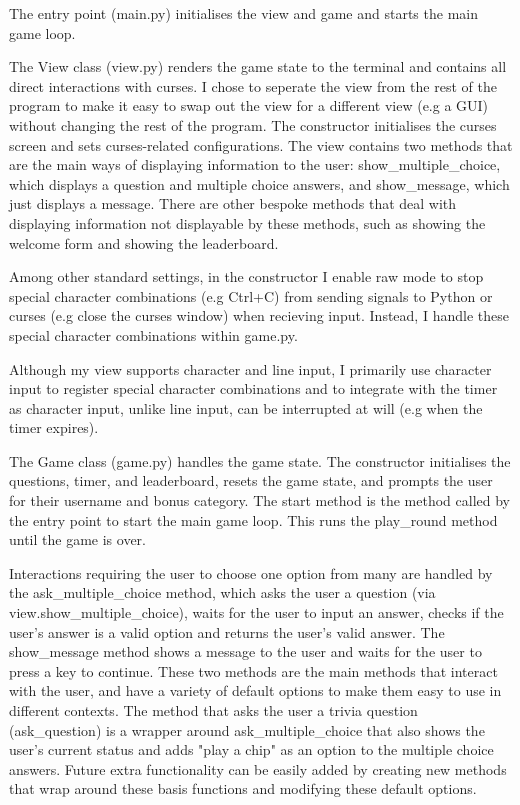 \documentclass[12pt]{article}
\begin{document}
The entry point (main.py) initialises the view and game and starts the main game loop.

\vspace{\baselineskip}

The View class (view.py) renders the game state to the terminal and contains all direct interactions with curses. I chose to seperate the view from the rest of the program to make it easy to swap out the view for a different view (e.g a GUI) without changing the rest of the program. The constructor initialises the curses screen and sets curses-related configurations. The view contains two methods that are the main ways of displaying information to the user: show\_multiple\_choice, which displays a question and multiple choice answers, and show\_message, which just displays a message. There are other bespoke methods that deal with displaying information not displayable by these methods, such as showing the welcome form and showing the leaderboard.

Among other standard settings, in the constructor I enable raw mode to stop special character combinations (e.g Ctrl+C) from sending signals to Python or curses (e.g close the curses window) when recieving input. Instead, I handle these special character combinations within game.py.

Although my view supports character and line input, I primarily use character input to register special character combinations and to integrate with the timer as character input, unlike line input, can be interrupted at will (e.g when the timer expires).

\vspace{\baselineskip}

The Game class (game.py) handles the game state. The constructor initialises the questions, timer, and leaderboard, resets the game state, and prompts the user for their username and bonus category. The start method is the method called by the entry point to start the main game loop. This runs the play\_round method until the game is over.

Interactions requiring the user to choose one option from many are handled by the ask\_multiple\_choice method, which asks the user a question (via view.show\_multiple\_choice), waits for the user to input an answer, checks if the user's answer is a valid option and returns the user's valid answer. The show\_message method shows a message to the user and waits for the user to press a key to continue. These two methods are the main methods that interact with the user, and have a variety of default options to make them easy to use in different contexts. The method that asks the user a trivia question (ask\_question) is a wrapper around ask\_multiple\_choice that also shows the user's current status and adds "play a chip" as an option to the multiple choice answers. Future extra functionality can be easily added by creating new methods that wrap around these basis functions and modifying these default options.
\end{document}
